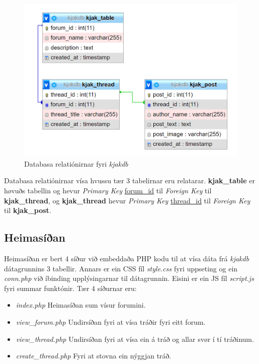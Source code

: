 \documentclass{article}
\begin{document}
\begin{figure}[H]
    \includegraphics[width=\linewidth]{kjakdb_table_relations.png}
    \caption{Databasa relatiónirnar fyri \textit{kjakdb}}
    \label{fig:kjakdb_table_relations}
\end{figure}

\par Databasa relatiónirnar vísa hvussu
tær 3 tabelirnar eru relatarar. \textbf{kjak\_table} er høvuðs tabellin og hevur
\textit{Primary Key} \underline{forum\_id} til \textit{Foreign Key} til \textbf{kjak\_thread},
og \textbf{kjak\_thread} hevur \textit{Primary Key} \underline{thread\_id} til \textit{Foreign Key}
til \textbf{kjak\_post}.

\subsection{Heimasíðan}
\par Heimasíðan er bert 4 síður við embeddaða PHP kodu til at vísa dáta frá \textit{kjakdb}
dátagrunnins 3 tabellir. Annars er ein CSS fíl \textit{style.css} fyri uppseting
og ein \textit{conn.php} við
íbinding upplýsingarnar til dátagrunnin. Eisini er ein JS fíl \textit{script.js} fyri summar funktónir.
Tær 4 síðurnar eru:
\begin{itemize}
    \item \textit{index.php} \- Heimasíðan sum vísur forumini.
    \item \textit{view\_forum.php} \- Undirsíðan fyri at vísa tráðir fyri eitt forum.
    \item \textit{view\_thread.php} \- Undirsíðan fyri at vísa ein á tráð og allar svør í tí
            tráðinum.
    \item \textit{create\_thread.php} \- Fyri at stovna ein nýggjan tráð.
\end{itemize}
\end{document}

